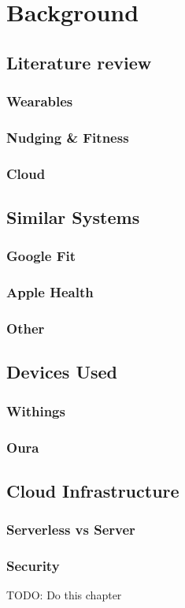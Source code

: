 \chapter{Background}
\label{cha:background}
\section{Literature review}
\subsection{Wearables}
\subsection{Nudging \& Fitness}
\subsection{Cloud}
\section{Similar Systems}
\subsection{Google Fit}
\subsection{Apple Health}
\subsection{Other}
\section{Devices Used}
\subsection{Withings}
\subsection{Oura}
\section{Cloud Infrastructure}
\subsection{Serverless vs Server}
\subsection{Security}


TODO: Do this chapter